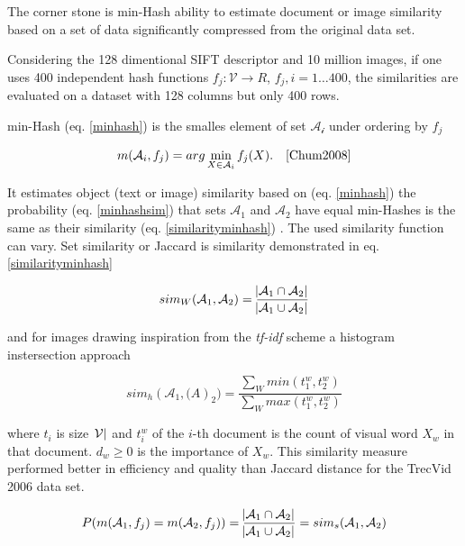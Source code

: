 \documentclass[english,12pt,a4paper,pdftex,elec,utf8]{aaltothesis}
\begin{document}
The corner stone is min-Hash ability to estimate document or image similarity based on a set of data significantly compressed from the original data set.

Considering the 128 dimentional SIFT descriptor and 10 million images, if one uses 400 independent hash functions $f_j:\mathcal{V} \rightarrow R$, $f_j, i = 1 \ldots 400$, the similarities are evaluated on a dataset with 128 columns but only 400 rows.

min-Hash (eq. \ref{minhash}) is the smalles element of set $\mathcal{A_i}$ under ordering by $f_j$

\begin{equation}\label{minhash}
m(\mathcal{A}_i,f_j)= arg \min_{X \in \mathcal{A}_i}f_j(X). \quad \cite{Chum2008}
\end{equation}

It estimates object (text or image) similarity based on (eq. \ref{minhash}) the probability (eq. \ref{minhashsim}) that sets $\mathcal{A}_1$ and $\mathcal{A}_2$ have equal min-Hashes is the same as their similarity (eq. \ref{similarityminhash}) \cite{Chum2008}. The used similarity function can vary. Set similarity or Jaccard is similarity demonstrated in eq. \ref{similarityminhash}

\begin{equation}\label{similarityminhash}
sim_W(\mathcal{A}_1,\mathcal{A}_2) = \frac{\abs{\mathcal{A}_1 \cap \mathcal{A}_2}}{\abs{\mathcal{A}_1 \cup \mathcal{A}_2}}
\end{equation}

 and for images drawing inspiration from the \emph{tf-idf} scheme a histogram instersection approach

\begin{equation}\label{similarityminhashimages}
sim_h(\mathcal{A}_1, \mathcal(A)_2)=\frac{\sum_W min(t^w_1,t^w_2)}{\sum_W max(t^w_1,t^w_2)}
\end{equation}

where $t_i$ is size $\abs{\mathcal{V}}$ and $t_i^w$ of the $i$-th document is the count of visual word $X_w$ in that document. $d_w \geq 0$ is the importance of $X_w$. This similarity measure performed better in efficiency and quality than Jaccard distance for the TrecVid 2006 data set. \cite{Chum2008}

\begin{equation}\label{minhashsim}
P(m(\mathcal{A}_1,f_j) = m(\mathcal{A}_2,f_j)) = \frac{\abs{\mathcal{A}_1 \cap \mathcal{A}_2}}{\abs{\mathcal{A}_1 \cup \mathcal{A}_2}} = sim_s(\mathcal{A}_1, \mathcal{A}_2)
\end{equation}
\end{document}
